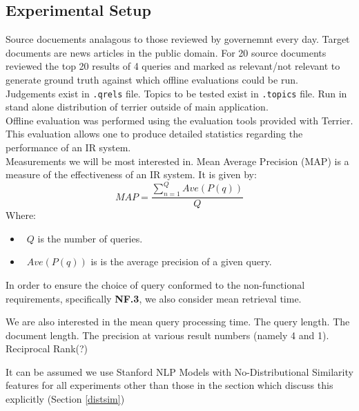 \documentclass{l4proj}
\newcommand{\code}[1]{\texttt{#1}}
\begin{document}
\subsection{Experimental Setup}
Source docuements analagous to those reviewed by governemnt every day.
Target documents are news articles in the public domain.
For 20 source documents reviewed the top 20 results of 4 queries and marked as relevant/not relevant to generate ground truth against which offline evaluations could be run.\\
Judgements exist in \code{.qrels} file.
Topics to be tested exist in \code{.topics} file.
Run in stand alone distribution of terrier outside of main application.\\
Offline evaluation was performed using the evaluation tools provided with Terrier. This evaluation allows one to produce detailed statistics regarding the performance of an IR system.\\

Measurements we will be most interested in.
Mean Average Precision (MAP) is a measure of the effectiveness of an IR system.
It is given by:
\begin{displaymath}
  MAP=\frac{\sum_{n=1}^{Q} Ave(P(q))}{Q}
\end{displaymath}
Where: 
\begin{itemize}
\item{~$Q$ is the number of queries.}
\item{~$Ave(P(q))$ is is the average precision of a given query.}
\end{itemize}

In order to ensure the choice of query conformed to the non-functional requirements, specifically \textbf{NF.3}, we also consider mean retrieval time.

We are also interested in the mean query processing time.
The query length.
The document length.
The precision at various result numbers (namely 4 and 1).
Reciprocal Rank(?)

It can be assumed we use Stanford NLP Models with No-Distributional Similarity features for all experiments other than those in the section which discuss this explicitly (Section \ref{distsim})
\end{document}
